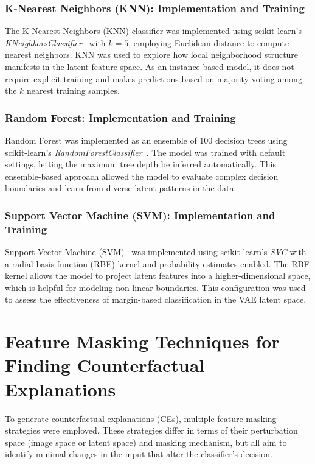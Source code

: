 \subsubsection{K-Nearest Neighbors (KNN): Implementation and Training}
\label{subsubsec:knn}
The K-Nearest Neighbors (KNN) classifier was implemented using scikit-learn’s \textit{KNeighborsClassifier}~\cite{Cover1967} with $k=5$, employing Euclidean distance to compute nearest neighbors. KNN was used to explore how local neighborhood structure manifests in the latent feature space. As an instance-based model, it does not require explicit training and makes predictions based on majority voting among the $k$ nearest training samples.

\subsubsection{Random Forest: Implementation and Training}
\label{subsubsec:random_forest}
Random Forest was implemented as an ensemble of 100 decision trees using scikit-learn’s \textit{RandomForestClassifier}~\cite{Breiman2001}. The model was trained with default settings, letting the maximum tree depth be inferred automatically. This ensemble-based approach allowed the model to evaluate complex decision boundaries and learn from diverse latent patterns in the data.

\subsubsection{Support Vector Machine (SVM): Implementation and Training}
\label{subsubsec:svm}
Support Vector Machine (SVM)~\cite{Cortes1995} was implemented using scikit-learn’s \textit{SVC} with a radial basis function (RBF) kernel and probability estimates enabled. The RBF kernel allows the model to project latent features into a higher-dimensional space, which is helpful for modeling non-linear boundaries. This configuration was used to assess the effectiveness of margin-based classification in the VAE latent space.




\section{Feature Masking Techniques for Finding Counterfactual Explanations}
\label{sec:feature_masking_pipeline}

To generate counterfactual explanations (CEs), multiple feature masking strategies were employed. These strategies differ in terms of their perturbation space (image space or latent space) and masking mechanism, but all aim to identify minimal changes in the input that alter the classifier’s decision.

